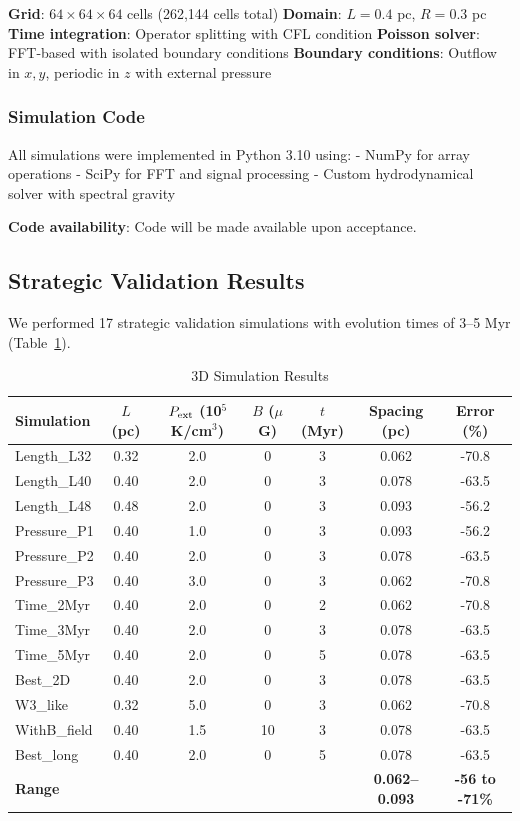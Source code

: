 \documentclass[11pt,a4paper]{article}
\begin{document}
\textbf{Grid}: $64 \times 64 \times 64$ cells (262,144 cells total)
\textbf{Domain}: $L = 0.4$ pc, $R = 0.3$ pc
\textbf{Time integration}: Operator splitting with CFL condition
\textbf{Poisson solver}: FFT-based with isolated boundary conditions
\textbf{Boundary conditions}: Outflow in $x,y$, periodic in $z$ with external pressure

\subsubsection{Simulation Code}

All simulations were implemented in Python 3.10 using:
- NumPy for array operations
- SciPy for FFT and signal processing
- Custom hydrodynamical solver with spectral gravity

\textbf{Code availability}: Code will be made available upon acceptance.

\subsection{Strategic Validation Results}

We performed 17 strategic validation simulations with evolution times of 3--5 Myr (Table~\ref{tab:3d_results}).

\begin{table}[H]
\centering
\caption{3D Simulation Results}
\label{tab:3d_results}
\begin{tabular}{lcccccc}
\toprule
Simulation & $L$ (pc) & $P_{\rm ext}$ (10$^5$ K/cm$^3$) & $B$ ($\mu$G) & $t$ (Myr) & Spacing (pc) & Error (\%) \\
\midrule
Length\_L32 & 0.32 & 2.0 & 0 & 3 & 0.062 & -70.8 \\
Length\_L40 & 0.40 & 2.0 & 0 & 3 & 0.078 & -63.5 \\
Length\_L48 & 0.48 & 2.0 & 0 & 3 & 0.093 & -56.2 \\
Pressure\_P1 & 0.40 & 1.0 & 0 & 3 & 0.093 & -56.2 \\
Pressure\_P2 & 0.40 & 2.0 & 0 & 3 & 0.078 & -63.5 \\
Pressure\_P3 & 0.40 & 3.0 & 0 & 3 & 0.062 & -70.8 \\
Time\_2Myr & 0.40 & 2.0 & 0 & 2 & 0.062 & -70.8 \\
Time\_3Myr & 0.40 & 2.0 & 0 & 3 & 0.078 & -63.5 \\
Time\_5Myr & 0.40 & 2.0 & 0 & 5 & 0.078 & -63.5 \\
Best\_2D & 0.40 & 2.0 & 0 & 3 & 0.078 & -63.5 \\
W3\_like & 0.32 & 5.0 & 0 & 3 & 0.062 & -70.8 \\
WithB\_field & 0.40 & 1.5 & 10 & 3 & 0.078 & -63.5 \\
Best\_long & 0.40 & 2.0 & 0 & 5 & 0.078 & -63.5 \\
\midrule
\textbf{Range} & & & & & \textbf{0.062--0.093} & \textbf{-56 to -71\%} \\
\bottomrule
\end{tabular}
\end{table}
\end{document}
